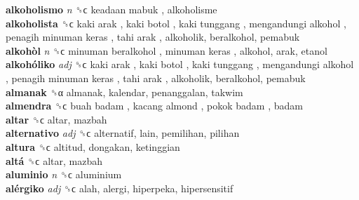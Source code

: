 \textbf{alkoholismo} \emph{n}  ␝ϲ   keadaan mabuk , alkoholisme  \\
\textbf{alkoholista} ␝ϲ   kaki arak ,  kaki botol ,  kaki tunggang ,  mengandungi alkohol ,  penagih minuman keras ,  tahi arak , alkoholik, beralkohol, pemabuk  \\
\textbf{alkohòl} \emph{n}  ␝ϲ   minuman beralkohol ,  minuman keras , alkohol, arak, etanol  \\
\textbf{alkohóliko} \emph{adj}  ␝ϲ   kaki arak ,  kaki botol ,  kaki tunggang ,  mengandungi alkohol ,  penagih minuman keras ,  tahi arak , alkoholik, beralkohol, pemabuk  \\
\textbf{almanak} ␝α  almanak, kalendar, penanggalan, takwim  \\
\textbf{almendra} ␝ϲ   buah badam ,  kacang almond ,  pokok badam , badam  \\
\textbf{altar} ␝ϲ  altar, mazbah  \\
\textbf{alternativo} \emph{adj}  ␝ϲ  alternatif, lain, pemilihan, pilihan  \\
\textbf{altura} ␝ϲ  altitud, dongakan, ketinggian  \\
\textbf{altá} ␝ϲ  altar, mazbah  \\
\textbf{aluminio} \emph{n}  ␝ϲ  aluminium  \\
\textbf{alérgiko} \emph{adj}  ␝ϲ  alah, alergi, hiperpeka, hipersensitif  \\
